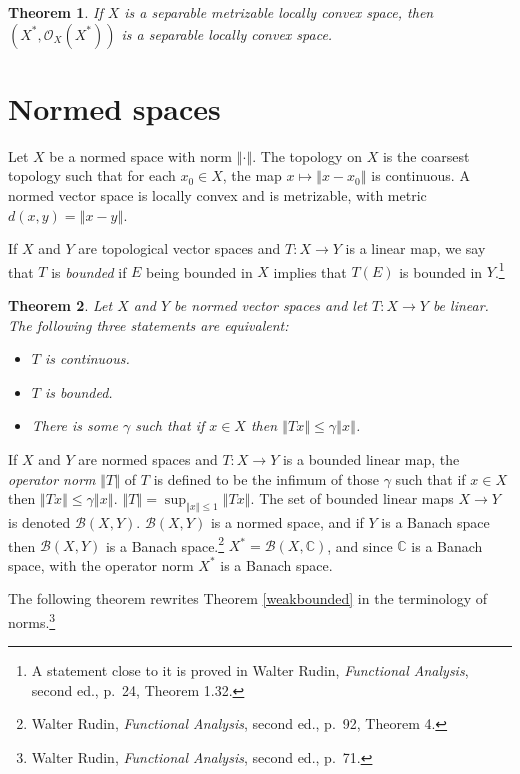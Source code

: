 \documentclass{article}
\newcommand{\norm}[1]{\left\Vert #1 \right\Vert}
\newtheorem{theorem}{Theorem}
\begin{document}
\begin{theorem}
If $X$ is a separable metrizable locally convex space, then $(X^*,\mathcal{O}_X(X^*))$ is a separable locally convex space.
\end{theorem}



\section{Normed spaces}
Let $X$ be a normed space with norm $\norm{\cdot}$.
The topology on $X$ is the coarsest topology such that for each $x_0 \in X$, the map $x \mapsto \norm{x-x_0}$ is continuous.
A normed vector space is locally convex and is metrizable, with metric $d(x,y)=\norm{x-y}$.


If $X$ and $Y$ are topological vector spaces and $T:X \to Y$ is a linear map, we say that $T$ is {\em bounded} if $E$ being bounded
in $X$ implies that $T(E)$ is bounded in $Y$.\footnote{A statement close to it is proved in Walter Rudin,
{\em Functional Analysis}, second ed., p.~24, Theorem 1.32.}

\begin{theorem}
Let $X$ and $Y$ be normed vector spaces and let $T:X \to Y$ be linear. The following three statements are equivalent:
\begin{itemize}
\item $T$ is continuous.
\item $T$ is bounded.
\item  There is some $\gamma$ such that if $x \in X$ then $\norm{Tx} \leq \gamma \norm{x}$.
\end{itemize}
\label{bounded}
\end{theorem}

If $X$ and $Y$ are normed spaces and $T:X \to Y$ is a bounded linear map,
the {\em operator norm} $\norm{T}$ of $T$ is defined to be the infimum of those $\gamma$ such that
if $x \in X$ then $\norm{Tx} \leq \gamma \norm{x}$. $\norm{T}=\sup_{\norm{x} \leq 1} \norm{Tx}$. 
The set of bounded linear maps $X \to Y$ is denoted $\mathscr{B}(X,Y)$.
 $\mathscr{B}(X,Y)$
is a normed space, and  if $Y$ is a Banach space then $\mathscr{B}(X,Y)$ is a Banach space.\footnote{Walter Rudin, {\em Functional Analysis}, second ed., p.~92, Theorem 4.}
$X^*=\mathscr{B}(X,\mathbb{C})$, and since $\mathbb{C}$ is a Banach space, with the operator
norm $X^*$ is a Banach space.


The following theorem rewrites 
 Theorem \ref{weakbounded} in the terminology of norms.\footnote{Walter Rudin, {\em Functional Analysis}, second ed., p.~71.}
\end{document}
